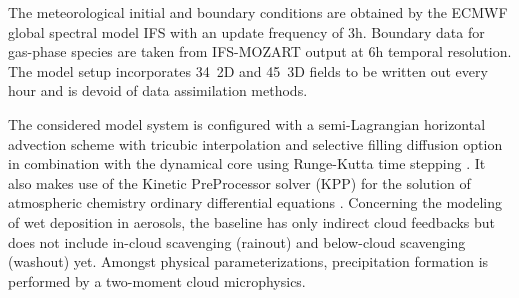 The meteorological initial and boundary conditions are obtained by the
ECMWF  global spectral  model  IFS  with an  update  frequency of  3h.
Boundary data  for gas-phase species are taken  from IFS-MOZART output
at  6h temporal resolution.   The model  setup incorporates  34~2D and
45~3D  fields to  be written  out  every hour  and is  devoid of  data
assimilation methods.

The   considered  \cosmoart   model  system   is  configured   with  a
semi-Lagrangian   horizontal    advection   sche\-me   with   tricubic
interpolation  and selective filling  diffusion option  in combination
with   the   dynamical    core   using   Runge-Kutta   time   stepping
\cite{COSMO-PartI-2011}.    It   also  makes   use   of  the   Kinetic
PreProcessor solver  (KPP) for  the solution of  atmospheric chemistry
ordinary  differential equations  \cite{Damian-2002}.   Concerning the
modeling  of  wet  deposition  in  aerosols, the  baseline  has  only
indirect  cloud feedbacks  but  does not  include in-cloud  scavenging
(rainout) and below-cloud  scavenging (washout) yet.  Amongst physical
parameterizations,   precipitation  formation   is   performed  by   a
two-moment cloud microphysics.
